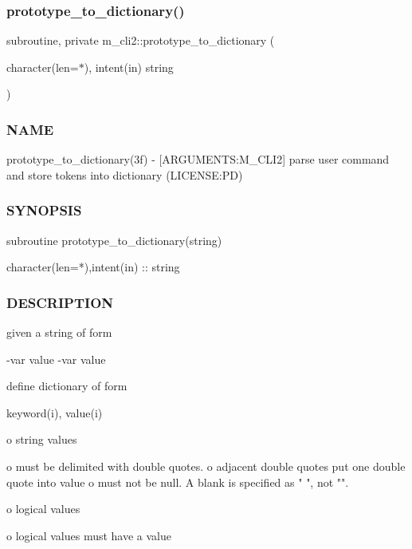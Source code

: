 \subsubsection{\texorpdfstring{prototype\+\_\+to\+\_\+dictionary()}{prototype\_to\_dictionary()}}
{\footnotesize\ttfamily subroutine, private m\+\_\+cli2\+::prototype\+\_\+to\+\_\+dictionary (\begin{DoxyParamCaption}\item[{character(len=$\ast$), intent(in)}]{string }\end{DoxyParamCaption})\hspace{0.3cm}{\ttfamily [private]}}



\subsubsection*{N\+A\+ME}

prototype\+\_\+to\+\_\+dictionary(3f) -\/ \mbox{[}A\+R\+G\+U\+M\+E\+N\+TS\+:M\+\_\+\+C\+L\+I2\mbox{]} parse user command and store tokens into dictionary (L\+I\+C\+E\+N\+SE\+:PD) 

\subsubsection*{S\+Y\+N\+O\+P\+S\+IS}

\begin{DoxyVerb} subroutine prototype_to_dictionary(string)

  character(len=*),intent(in)     ::  string
\end{DoxyVerb}


\subsubsection*{D\+E\+S\+C\+R\+I\+P\+T\+I\+ON}

given a string of form

-\/var value -\/var value

define dictionary of form

keyword(i), value(i)

o string values \begin{DoxyVerb}o must be delimited with double quotes.
o adjacent double quotes put one double quote into value
o must not be null. A blank is specified as " ", not "".
\end{DoxyVerb}


o logical values \begin{DoxyVerb}o logical values must have a value
\end{DoxyVerb}


